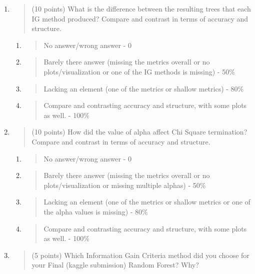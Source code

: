 \documentclass[
]{article}
\begin{document}
\begin{enumerate}
\def\labelenumi{\arabic{enumi}.}
\item
  \begin{quote}
  (10 points) What is the difference between the resulting trees that
  each IG method produced? Compare and contrast in terms of accuracy and
  structure.
  \end{quote}

  \begin{enumerate}
  \def\labelenumii{\alph{enumii}.}
  \item
    \begin{quote}
    No answer/wrong answer - 0
    \end{quote}
  \item
    \begin{quote}
    Barely there answer (missing the metrics overall or no
    plots/visualization or one of the IG methods is missing) - 50\%
    \end{quote}
  \item
    \begin{quote}
    Lacking an element (one of the metrics or shallow metrics) - 80\%
    \end{quote}
  \item
    \begin{quote}
    Compare and contrasting accuracy and structure, with some plots as
    well. - 100\%
    \end{quote}
  \end{enumerate}
\item
  \begin{quote}
  (10 points) How did the value of alpha affect Chi Square termination?
  Compare and contrast in terms of accuracy and structure.
  \end{quote}

  \begin{enumerate}
  \def\labelenumii{\alph{enumii}.}
  \item
    \begin{quote}
    No answer/wrong answer - 0
    \end{quote}
  \item
    \begin{quote}
    Barely there answer (missing the metrics overall or no
    plots/visualization or missing multiple alphas) - 50\%
    \end{quote}
  \item
    \begin{quote}
    Lacking an element (one of the metrics or shallow metrics or one of
    the alpha values is missing) - 80\%
    \end{quote}
  \item
    \begin{quote}
    Compare and contrasting accuracy and structure, with some plots as
    well. - 100\%
    \end{quote}
  \end{enumerate}
\item
  \begin{quote}
  (5 points) Which Information Gain Criteria method did you choose for
  your Final (kaggle submission) Random Forest? Why?
  \end{quote}


\end{enumerate}
\end{document}
